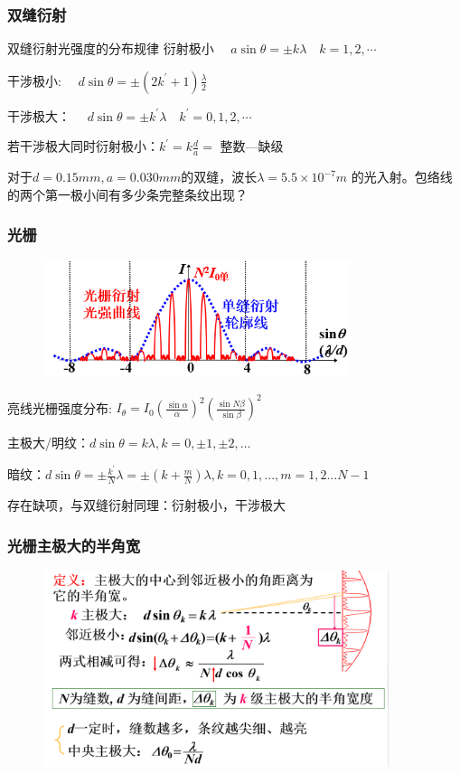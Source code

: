 \documentclass[UTF8]{ctexbeamer}
\begin{document}
\begin{frame}
	\frametitle{双缝衍射}
\begin{block}{双缝衍射光强度的分布规律}
衍射极小 $\quad a \sin \theta= \pm k \lambda \quad k=1,2, \cdots$

干涉极小: $\quad d \sin \theta= \pm\left(2 k^{\prime}+1\right) \frac{\lambda}{2}$

干涉极大： $\quad d \sin \theta= \pm k^{\prime} \lambda \quad k^{\prime}=0,1,2, \cdots$

若干涉极大同时衍射极小：$k^{\prime}=k \frac{d}{a}=$ 整数—缺级
\end{block}
\begin{examples}
	对于$d=0.15mm,a=0.030mm$的双缝，波长$\lambda=5.5\times10^{-7}m$ 的光入射。包络线的两个第一极小间有多少条完整条纹出现？
\end{examples}
\end{frame}
\begin{frame}
	\frametitle{光栅}
		\begin{figure}[!ht]
		\centering
		\includegraphics[width=0.8\textwidth]{25}
	\end{figure}
	亮线光栅强度分布: $I_\theta=I_0\left(\frac{\sin \alpha}{\alpha}\right)^2\left(\frac{\sin N \beta}{\sin \beta}\right)^2$
	
	主极大/明纹：$d \sin \theta=k \lambda, k=0, \pm 1, \pm 2, \ldots$
	
	暗纹：$d\sin\theta=\pm\frac{k^{\prime}}N\lambda=\pm(k+\frac mN)\lambda,k=0,1,..., m=1,2...N-1$

	存在缺项，与双缝衍射同理：衍射极小，干涉极大
\end{frame}
\begin{frame}
	\frametitle{光栅主极大的半角宽}
	\begin{figure}[!ht]
		\centering
		\includegraphics[width=0.9\textwidth]{32}
	\end{figure}

\end{frame}
\end{document}
